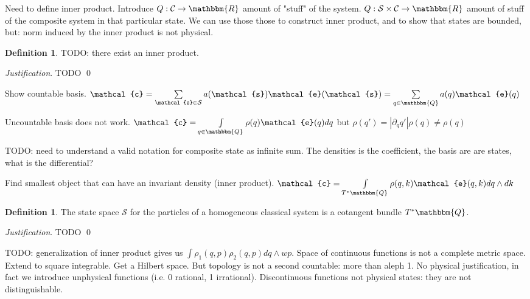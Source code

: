 \documentclass[aps,pra,10pt,twocolumn,floatfix,nofootinbib]{revtex4-1}
\theoremstyle{definition}
\newtheorem{defn}[prop]{Definition}
\newenvironment{justification}{\emph{Justification}.}{\qed}
\begin{document}
Need to define inner product. Introduce $Q:\mathcal{C} \to \mathbbm{R}$ amount of "stuff" of the system. $Q:\mathcal{S}\times\mathcal{C} \to \mathbbm{R}$ amount of stuff of the composite system in that particular state. We can use those those to construct inner product, and to show that states are bounded, but: norm induced by the inner product is not physical.

\begin{defn}\label{classical_inner_product}
	TODO: there exist an inner product.
\end{defn}

\begin{justification}
	TODO
\end{justification}

Show countable basis. $\mathcal{c}= \sum\limits_{\mathcal{s} \in \mathcal{S}} a(\mathcal{s}) \mathcal{e}(\mathcal{s})=\sum\limits_{q \in \mathbbm{Q}} a(q) \mathcal{e}(q)$


Uncountable basis does not work. $\mathcal{c}= \int\limits_{q \in \mathbbm{Q}} \rho(q) \mathcal{e}(q)dq$ but $\rho(q')=|\partial _{q}q'|\rho(q)\neq\rho(q)$

TODO: need to understand a valid notation for composite state as infinite sum. The densities is the coefficient, the basis are are states, what is the differential?

Find smallest object that can have an invariant density (inner product). $\mathcal{c}= \int\limits_{T^*\mathbbm{Q}} \rho(q,k) \mathcal{e}(q,k)dq\wedge dk$

\begin{defn}\label{classical_phase_space}
The state space $\mathcal{S}$ for the particles of a homogeneous classical  system is a cotangent bundle $T^*\mathbbm{Q}$.
\end{defn}

\begin{justification}
	TODO
\end{justification}

TODO: generalization of inner product gives us $\int \rho_1(q, p) \rho_2(q, p) dq\wedge wp$. Space of continuous functions is not a complete metric space. Extend to square integrable. Get a Hilbert space. But topology is not a second countable: more than aleph 1. No physical justification, in fact we introduce unphysical functions (i.e. 0 rational, 1 irrational). Discontinuous functions not physical states: they are not distinguishable.
\end{document}
